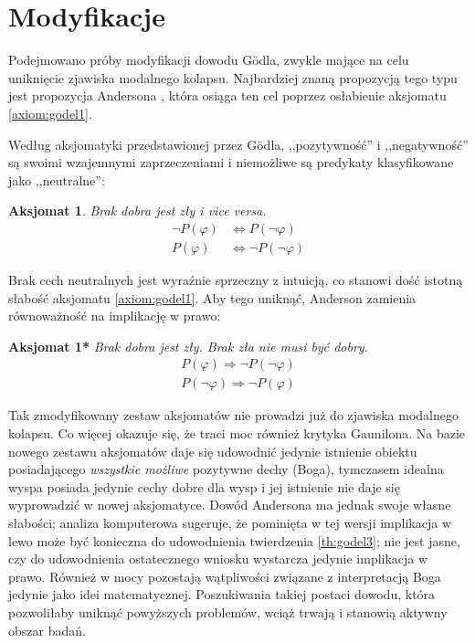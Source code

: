 \documentclass[
	runningheads
]{llncs}
\newtheorem{axiom-pl}{Aksjomat}
\begin{document}
\section{Modyfikacje} \label{sec:modyfikacje}

\setcounter{axiom-pl}{0}

Podejmowano próby modyfikacji dowodu G\"odla, zwykle mające na celu uniknięcie zjawiska modalnego kolapsu. Najbardziej znaną propozycją tego typu jest propozycja Andersona \cite{anderson1990}, która osiąga ten cel poprzez osłabienie aksjomatu \ref{axiom:godel1}. 

Według aksjomatyki przedstawionej przez G\"odla, ,,pozytywność'' i ,,negatywność'' są swoimi wzajemnymi zaprzeczeniami i niemożliwe są predykaty klasyfikowane jako ,,neutralne'':
\begin{axiom-pl}
	Brak dobra jest zły i vice versa. 
	\begin{align*}
	\neg P(\varphi) & \Leftrightarrow P(\neg \varphi) \\ 
	P(\varphi) & \Leftrightarrow \neg P( \neg \varphi )
	\end{align*}
\end{axiom-pl}
Brak cech neutralnych jest wyraźnie sprzeczny z intuicją, co stanowi dość istotną słabość aksjomatu \ref{axiom:godel1}. Aby tego uniknąć, Anderson zamienia równoważność na implikację w prawo:

\vspace*{0.2cm}
\noindent\textbf{Aksjomat 1*} \hspace*{0.1cm}
\textit{Brak dobra jest zły. Brak zła nie musi być dobry. }
\begin{align*}
	P(\varphi) \Rightarrow \neg P( \neg \varphi ) \\ 
	P( \neg \varphi ) \Rightarrow \neg P(\varphi)
\end{align*}

Tak zmodyfikowany zestaw aksjomatów nie prowadzi już do zjawiska modalnego kolapsu. Co więcej okazuje się, że traci moc również krytyka Gaunilona. Na bazie nowego zestawu aksjomatów daje się udowodnić jedynie istnienie obiektu posiadającego \emph{wszystkie możliwe} pozytywne dechy (Boga), tymczasem idealna wyspa posiada jedynie cechy dobre dla wysp i jej istnienie nie daje się wyprowadzić w nowej aksjomatyce. Dowód Andersona ma jednak swoje własne słabości; analiza komputerowa \cite{benzmuller2016} sugeruje, że pominięta w tej wersji implikacja w lewo może być konieczna do udowodnienia twierdzenia \ref{th:godel3}; nie jest jasne, czy do udowodnienia ostatecznego wniosku wystarcza jedynie implikacja w prawo. Również w mocy pozostają wątpliwości związane z interpretacją Boga jedynie jako idei matematycznej. Poszukiwania takiej postaci dowodu, która pozwoliłaby uniknąć powyższych problemów, wciąż trwają i stanowią aktywny obszar badań. 
\end{document}
